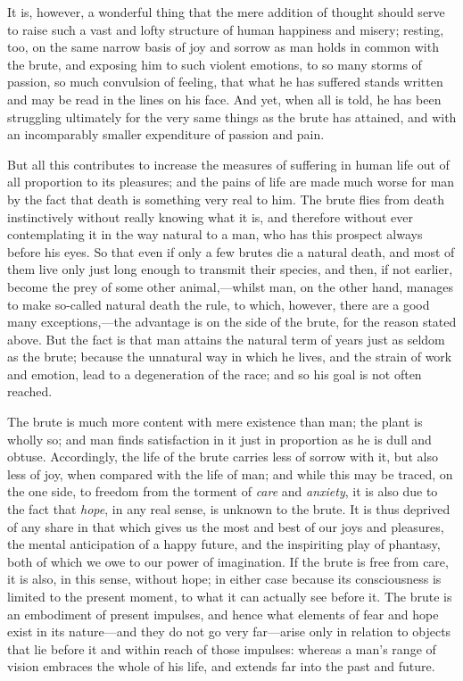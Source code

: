 It is, however, a wonderful thing that the mere addition of thought
should serve to raise such a vast and lofty structure of human
happiness and misery; resting, too, on the same narrow basis of joy
and  sorrow as man holds in common with the brute, and
exposing him to such violent emotions, to so many storms of passion,
so much convulsion of feeling, that what he has suffered stands
written and may be read in the lines on his face. And yet, when all is
told, he has been struggling ultimately for the very same things as
the brute has attained, and with an incomparably smaller expenditure
of passion and pain.

But all this contributes to increase the measures of suffering in
human life out of all proportion to its pleasures; and the pains of
life are made much worse for man by the fact that death is something
very real to him. The brute flies from death instinctively without
really knowing what it is, and therefore without ever contemplating it
in the way natural to a man, who has this prospect always before his
eyes. So that even if only a few brutes die a natural death, and most
of them live only just long enough to transmit their species, and
then, if not earlier, become the prey of some other animal,---whilst
man, on the other hand, manages to make so-called natural death the
rule, to which, however, there are a good many exceptions,---the
advantage is on the side of the brute, for the reason stated above.
But the fact is that man attains the natural term of years just as
seldom as the brute; because the unnatural way in which he lives, and
the strain of work and emotion, lead to a degeneration of the race;
and so his goal is not often reached.

The brute is much more content with mere existence than man; the plant
is wholly so; and man finds satisfaction in it just in proportion as
he is dull  and obtuse. Accordingly, the life of the brute
carries less of sorrow with it, but also less of joy, when compared
with the life of man; and while this may be traced, on the one side,
to freedom from the torment of \textit{care} and \textit{anxiety}, it
is also due to the fact that \textit{hope}, in any real sense, is
unknown to the brute. It is thus deprived of any share in that which
gives us the most and best of our joys and pleasures, the mental
anticipation of a happy future, and the inspiriting play of phantasy,
both of which we owe to our power of imagination. If the brute is free
from care, it is also, in this sense, without hope; in either case
because its consciousness is limited to the present moment, to what it
can actually see before it. The brute is an embodiment of present
impulses, and hence what elements of fear and hope exist in its
nature---and they do not go very far---arise only in relation to
objects that lie before it and within reach of those impulses: whereas
a man's range of vision embraces the whole of his life, and extends
far into the past and future.

